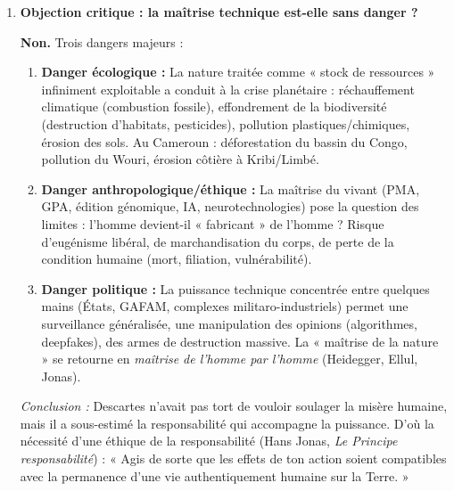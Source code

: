 \documentclass[11pt]{article}
\newcommand{\cle}[1]{{\popxbold\color{popdark}#1}}
\begin{document}
\begin{corrige}
\begin{enumerate}
\item \textbf{Objection critique : la maîtrise technique est-elle sans danger ?}
\par\textbf{Non.} Trois dangers majeurs :
\begin{enumerate}
\item \textbf{Danger écologique :} La nature traitée comme « stock de ressources » infiniment exploitable a conduit à la \cle{crise planétaire} : réchauffement climatique (combustion fossile), effondrement de la biodiversité (destruction d'habitats, pesticides), pollution plastiques/chimiques, érosion des sols. Au Cameroun : déforestation du bassin du Congo, pollution du Wouri, érosion côtière à Kribi/Limbé.
\item \textbf{Danger anthropologique/éthique :} La maîtrise du vivant (PMA, GPA, édition génomique, IA, neurotechnologies) pose la question des \cle{limites} : l'homme devient-il « fabricant » de l'homme ? Risque d'eugénisme libéral, de marchandisation du corps, de perte de la \cle{condition humaine} (mort, filiation, vulnérabilité).
\item \textbf{Danger politique :} La puissance technique concentrée entre quelques mains (États, GAFAM, complexes militaro-industriels) permet une \cle{surveillance} généralisée, une \cle{manipulation} des opinions (algorithmes, deepfakes), des \cle{armes} de destruction massive. La « maîtrise de la nature » se retourne en \emph{maîtrise de l'homme par l'homme} (Heidegger, Ellul, Jonas).
\end{enumerate}
\par\emph{Conclusion :} Descartes n'avait pas tort de vouloir soulager la misère humaine, mais il a sous-estimé la \cle{responsabilité} qui accompagne la puissance. D'où la nécessité d'une \cle{éthique de la responsabilité} (Hans Jonas, \emph{Le Principe responsabilité}) : « Agis de sorte que les effets de ton action soient compatibles avec la permanence d'une vie authentiquement humaine sur la Terre. »
\end{enumerate}
\end{corrige}
\end{document}
